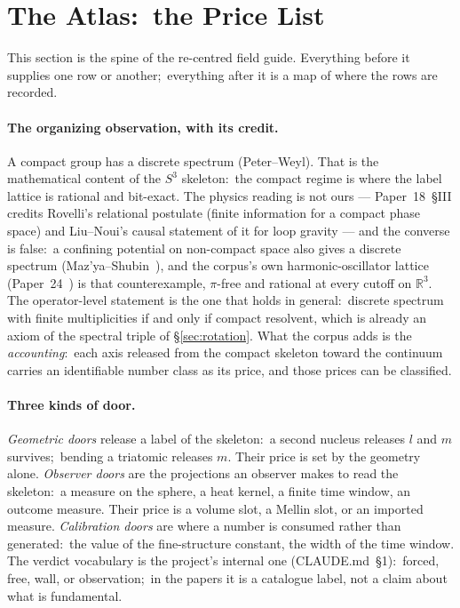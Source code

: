 \documentclass[11pt,a4paper]{article}
\newcommand{\sthree}{S^{3}}
\begin{document}
\section{The Atlas:\ the Price List}
\label{sec:atlas}

This section is the spine of the re-centred field guide.  Everything
before it supplies one row or another;\ everything after it is a map
of where the rows are recorded.

\paragraph{The organizing observation, with its credit.}
A compact group has a discrete spectrum (Peter--Weyl).  That is the
mathematical content of the $\sthree$ skeleton:\ the compact regime is
where the label lattice is rational and bit-exact.  The physics reading
is not ours --- Paper~18~\S III credits Rovelli's relational postulate
(finite information for a compact phase space) and Liu--Noui's causal
statement of it for loop gravity --- and the converse is false:\ a
confining potential on non-compact space also gives a discrete spectrum
(Maz'ya--Shubin~\cite{mazya_shubin2005}), and the corpus's own
harmonic-oscillator lattice (Paper~24~\cite{loutey_paper24}) is that
counterexample, $\pi$-free and rational at every cutoff on
$\mathbb{R}^3$.  The operator-level statement is the one that holds in
general:\ discrete spectrum with finite multiplicities if and only if
compact resolvent, which is already an axiom of the spectral triple of
\S\ref{sec:rotation}.  What the corpus adds is the \emph{accounting}:\
each axis released from the compact skeleton toward the continuum
carries an identifiable number class as its price, and those prices can
be classified.

\paragraph{Three kinds of door.}
\emph{Geometric doors} release a label of the skeleton:\ a second
nucleus releases $l$ and $m$ survives;\ bending a triatomic releases
$m$.  Their price is set by the geometry alone.  \emph{Observer doors}
are the projections an observer makes to read the skeleton:\ a measure
on the sphere, a heat kernel, a finite time window, an outcome measure.
Their price is a volume slot, a Mellin slot, or an imported measure.
\emph{Calibration doors} are where a number is consumed rather than
generated:\ the value of the fine-structure constant, the width of the
time window.  The verdict vocabulary is the project's internal one
(CLAUDE.md~\S 1):\ forced, free, wall, or observation;\ in the papers it
is a catalogue label, not a claim about what is fundamental.
\end{document}
